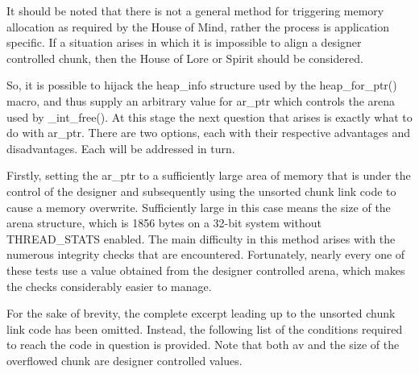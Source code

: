 \documentclass[12pt]{article}
\begin{document}
It should be noted that there is not a general method for
triggering memory allocation as required by the House of Mind,
rather the process is application specific. If a situation arises
in which it is impossible to align a designer controlled chunk,
then the House of Lore or Spirit should be considered.
\newline


So, it is possible to hijack the heap\_info structure used by the
heap\_for\_ptr() macro, and thus supply an arbitrary value for ar\_ptr
which controls the arena used by \_int\_free(). At this stage the
next question that arises is exactly what to do with ar\_ptr. There
are two options, each with their respective advantages and
disadvantages. Each will be addressed in turn.
\newline


Firstly, setting the ar\_ptr to a sufficiently large area of memory
that is under the control of the designer and subsequently using
the unsorted chunk link code to cause a memory overwrite.
Sufficiently large in this case means the size of the arena
structure, which is 1856 bytes on a 32-bit system without
THREAD\_STATS enabled. The main difficulty in this method arises
with the numerous integrity checks that are encountered.
Fortunately, nearly every one of these tests use a value obtained
from the designer controlled arena, which makes the checks
considerably easier to manage.
\newline


For the sake of brevity, the complete excerpt leading up to the
unsorted chunk link code has been omitted. Instead, the following
list of the conditions required to reach the code in question is
provided. Note that both av and the size of the overflowed chunk
are designer controlled values.
\newline
\end{document}
